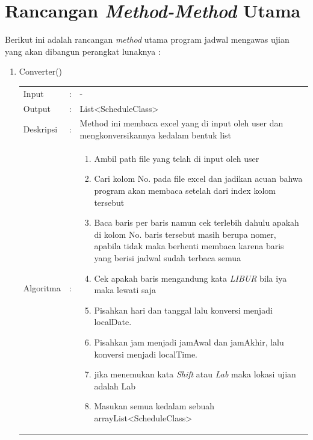 \section{Rancangan \textit{Method-Method} Utama}
Berikut ini adalah rancangan \textit{method} utama program jadwal mengawas ujian yang akan dibangun perangkat lunaknya :
\begin{enumerate}
	\item Converter() \\
	\begin{tabular}{l c p{9cm}}
		Input & : & - \\ 
		Output & : & List<ScheduleClass> \\ 
		Deskripsi & : & Method ini membaca excel yang di input oleh user dan mengkonversikannya kedalam bentuk list\\
		Algoritma & : & \begin{enumerate}
			\item Ambil path file yang telah di input oleh user
			\item Cari kolom No. pada file excel dan jadikan acuan bahwa program akan membaca setelah dari index kolom tersebut
			\item Baca baris per baris namun cek terlebih dahulu apakah di kolom No. baris tersebut masih berupa nomer, apabila tidak maka berhenti membaca karena baris yang berisi jadwal sudah terbaca semua
			\item Cek apakah baris mengandung kata \textit{LIBUR} bila iya maka lewati saja
			\item Pisahkan hari dan tanggal lalu konversi menjadi localDate. 
			\item Pisahkan jam menjadi jamAwal dan jamAkhir, lalu konversi menjadi localTime.
			\item jika menemukan kata \textit{Shift} atau \textit{Lab} maka lokasi ujian adalah Lab
			\item Masukan semua kedalam sebuah arrayList<ScheduleClass>
		\end{enumerate}
		\end{tabular}	
	

\end{enumerate}
